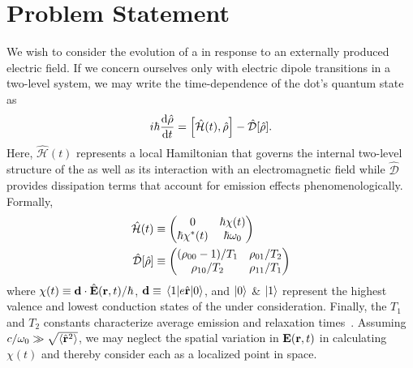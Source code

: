 \section{\label{section:problem statement}Problem Statement}
We wish to consider the evolution of a \qd{} in response to an externally produced electric field.
If we concern ourselves only with electric dipole transitions in a two-level system, we may write the time-dependence of the dot's quantum state as
\begin{equation}
  i \hbar \dv{\hat{\rho}}{t} = \commutator{\hat{\mathcal{H}}(t)}{\hat{\rho}} - \hat{\mathcal{D}}\qty[\hat{\rho}].
  \label{eq:liouville}
\end{equation}
Here, $\hat{\mathcal{H}}(t)$ represents a local Hamiltonian that governs the internal two-level structure of the \qd{} as well as its interaction with an electromagnetic field while $\hat{\mathcal{D}}$ provides dissipation terms that account for emission effects phenomenologically.
Formally,
\begin{subequations}
  \begin{align}
    \hat{\mathcal{H}}(t) &\equiv \mqty(0 & \hbar \chi(t) \\ \hbar \chi^*(t) & \hbar \omega_0) \label{eq:hamiltonian}\\
    \hat{\mathcal{D}}\qty[\hat{\rho}] &\equiv \mqty( \qty(\rho_{00} - 1)/{T_1} & \rho_{01}/{T_2} \\ \rho_{10}/{T_2} & \rho_{11}/T_1 ) \label{eq:dissipator}
  \end{align}
\end{subequations}
where $\chi(t) \equiv \vb{d} \cdot \hat{\vb{E}}(\vb{r}, t)/\hbar$, $\vb{d} \equiv \matrixel{1}{e \hat{\vb{r}}}{0}$, and $\ket{0}$ \& $\ket{1}$ represent the highest valence and lowest conduction states of the \qd{} under consideration.
Finally, the $T_1$ and $T_2$ constants characterize average emission and relaxation times~\cite{}.
Assuming $c/\omega_0 \gg \sqrt{\expval{\hat{\vb{r}}^2}}$, we may neglect the spatial variation in $\vb{E}(\vb{r}, t)$ in calculating $\chi(t)$ and thereby consider each \qd{} as a localized point in space.


